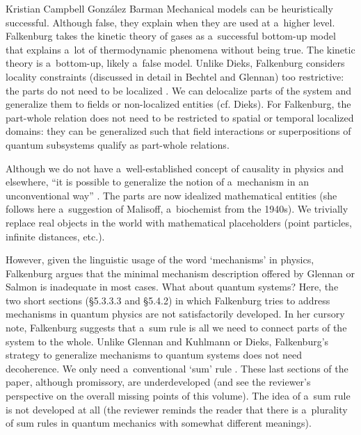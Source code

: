 \begin{recengenv}{Kristian Campbell González Barman}
Mechanical models can be heuristically successful. Although false, they explain when they are used at a~higher level. Falkenburg takes the kinetic theory of gases as a~successful bottom-up model that explains a~lot of thermodynamic phenomena without being true. The kinetic theory is a~bottom-up, likely a~false model. Unlike Dieks, Falkenburg considers locality constraints (discussed in detail in Bechtel and Glennan) too restrictive: the parts do not need to be localized
\parencite*[][p.81]{falkenburg_mechanistic_2019}. %
 We can delocalize parts of the system and generalize them to fields or non-localized entities (cf. Dieks). For Falkenburg, the part-whole relation does not need to be restricted to spatial or temporal localized domains: they can be generalized such that field interactions or superpositions of quantum subsystems qualify as part-whole relations.

Although we do not have a~well-established concept of causality in physics and elsewhere, ``it is possible to generalize the notion of a~mechanism in an unconventional way''
\parencite*[][p.82]{falkenburg_mechanistic_2019}. %
 The parts are now idealized mathematical entities (she follows here a~suggestion of Malisoff, a~biochemist from the 1940s). We trivially replace real objects in the world with mathematical placeholders (point particles, infinite distances, etc.).

However, given the linguistic usage of the word ‘mechanisms' in physics, Falkenburg argues that the minimal mechanism description offered by Glennan or Salmon is inadequate in most cases. What about quantum systems? Here, the two short sections (§5.3.3.3 and §5.4.2) in which Falkenburg tries to address mechanisms in quantum physics are not satisfactorily developed. In her cursory note, Falkenburg suggests that a~sum rule is all we need to connect parts of the system to the whole. Unlike Glennan and Kuhlmann or Dieks, Falkenburg's strategy to generalize mechanisms to quantum systems does not need decoherence. We only need a~conventional ‘sum' rule
\parencite*[][p.83]{falkenburg_mechanistic_2019}. %
 These last sections of the paper, although promissory, are underdeveloped (and see the reviewer's perspective on the overall missing points of this volume). The idea of a~sum rule is not developed at all (the reviewer reminds the reader that there is a~plurality of sum rules in quantum mechanics with somewhat different meanings).


\end{recengenv}
